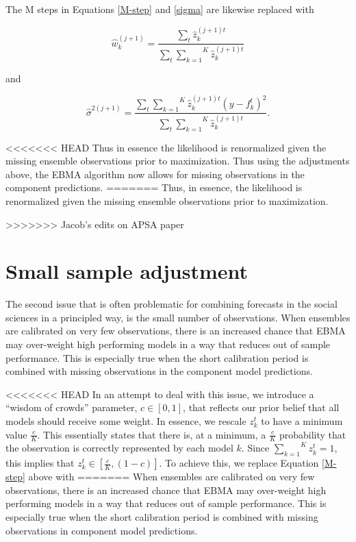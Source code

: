 \documentclass[12pt,fullpage,endnotes]{article}
\begin{document}
\noindent  The M steps in Equations \ref{M-step} and \ref{sigma} are likewise replaced with

\begin{equation}
\hat{w}^{(j+1)}_k=\frac{\underset{t}{\sum}\hat{z}^{(j+1)t}_{k}}{\underset{t}{\sum}\overset{K}{\underset{k=1}{ \sum}} \hat{z}_k^{(j+1)t}}
\end{equation}


\noindent and

\begin{equation}
\hat{\sigma}^{2(j+1)}=\frac{\underset{t}{\sum}\overset{K}{\underset{k=1}{\sum}}\hat{z}^{(j+1)t}_{k}(y-f_{k}^{t})^2 }{\underset{t}{\sum}\overset{K}{\underset{k=1}{ \sum}} \hat{z}_k^{(j+1)t}}.
\end{equation}

<<<<<<< HEAD
Thus in essence the likelihood is renormalized given the missing ensemble observations prior to maximization. Thus using the adjustments above, the EBMA algorithm now allows for missing observations in the component predictions.
=======
\noindent Thus, in essence, the likelihood is renormalized given the
missing ensemble observations prior to maximization.

>>>>>>> Jacob's edits on APSA paper

\section{Small sample adjustment}
\label{woc}
The second issue that is often problematic for combining forecasts in the social sciences in a principled way, is the small number of observations. When ensembles are calibrated on very few observations, there is an increased chance that EBMA may over-weight high performing models in a way that reduces out of sample performance. This is especially true when the short calibration period is combined with missing observations in the component model predictions. %

<<<<<<< HEAD
In an attempt to deal with this issue, we introduce a ``wisdom of crowds'' parameter, $c \in [0,1]$, that reflects our prior
belief that all models should receive some weight.  In essence, we
rescale $z^t_k$ to have a minimum value $\frac{c}{K}$.  This
essentially states that there is, at a minimum, a $\frac{c}{K}$
probability that the observation is correctly represented by each
model $k$.  Since $\overset{K}{\underset{k=1}{\sum}} z_k^t = 1$, this
implies that $z_k^t \in [\frac{c}{K}, (1-c)]$.  To achieve this, we
replace Equation \ref{M-step} above with
=======
When ensembles are calibrated on very few observations, there is an
increased chance that EBMA may over-weight high performing models in a
way that reduces out of sample performance. This is especially true
when the short calibration period is combined with missing
observations in component model predictions. %
\end{document}
